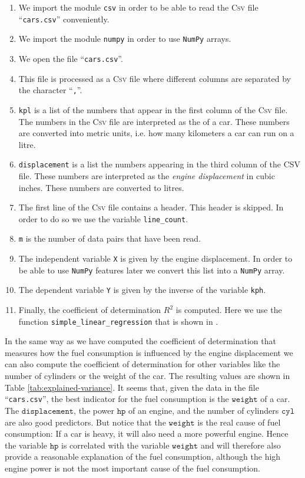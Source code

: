 \begin{enumerate}
\item We import the module \texttt{csv} in order to be able to read the \textsc{Csv} file ``\texttt{cars.csv}''
      conveniently.
\item We import the module \texttt{numpy} in order to use \texttt{NumPy} arrays.
\item We open the file ``\texttt{cars.csv}''.
\item This file is processed as a \textsc{Csv} file where different columns are separated by the character 
      ``\texttt{,}''.
\item \texttt{kpl} is a list of the numbers that appear in the first column of the \textsc{Csv} file.
      The numbers in the \textsc{Csv} file are interpreted as the  of a car.
      These numbers are converted into metric units, i.e. how many kilometers a car can run on a litre.
\item \texttt{displacement} is a list the numbers appearing in the third column of the \textsc{CSV} file.
      These numbers are interpreted as the \emph{engine displacement} in cubic inches.
      These numbers are converted to litres.
\item The first line of the \textsc{Csv} file contains a header.  This header is skipped.
      In order to do so we use the variable \texttt{line\_count}.
\item \texttt{m} is the number of data pairs that have been read.
\item The independent variable \texttt{X} is given by the engine displacement. 
      In order to be able to use \texttt{NumPy} features later we convert this list into a \texttt{NumPy} array.
\item The dependent variable \texttt{Y} is given by the inverse of the variable \texttt{kph}.
\item Finally, the coefficient of determination $R^2$ is computed. Here we use the function \hspace*{\fill} \linebreak
      \texttt{simple\_linear\_regression} that is shown in .
\end{enumerate}
In the same way as we have computed the coefficient of determination that measures how the fuel consumption is
influenced by the engine displacement we can also compute the coefficient of determination for other variables
like the number of cylinders or the weight of the car.  
The resulting values are shown in Table \ref{tab:explained-variance}.  It
seems that, given the data in the file ``\texttt{cars.csv}'', the best indicator for the fuel consumption is
the $\mathtt{weight}$ of a car.  The $\mathtt{displacement}$, the power $\mathtt{hp}$ of an engine, and the
number of cylinders $\mathtt{cyl}$ are also good predictors.  But notice that the $\mathtt{weight}$ is the real
cause of fuel consumption:  If a car is heavy, it will also need a more powerful engine. Hence the
variable $\mathtt{hp}$ is correlated with the variable $\mathtt{weight}$ and will therefore also provide a
reasonable explanation of the fuel consumption, although the high engine power is not the most important cause
of the fuel consumption. 


